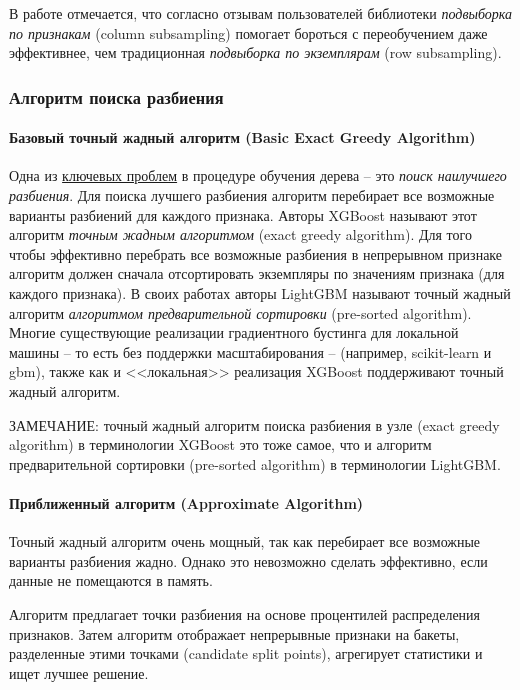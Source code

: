 \documentclass[%
	11pt,
	a4paper,
	utf8,
		]{article}
\begin{document}
В работе отмечается, что согласно отзывам пользователей библиотеки \emph{подвыборка по признакам} (column subsampling) помогает бороться с переобучением даже эффективнее, чем традиционная \emph{подвыборка по экземплярам} (row subsampling).

\subsubsection{Алгоритм поиска разбиения}

\paragraph{Базовый точный жадный алгоритм (Basic Exact Greedy Algorithm)} 

Одна из \underline{ключевых проблем} в процедуре обучения дерева -- это \emph{поиск наилучшего разбиения}. Для поиска лучшего разбиения алгоритм перебирает все возможные варианты разбиений для каждого признака. Авторы XGBoost называют этот алгоритм \emph{точным жадным алгоритмом} (exact greedy algorithm). Для того чтобы эффективно перебрать все возможные разбиения в непрерывном признаке алгоритм должен сначала отсортировать экземпляры по значениям признака (для каждого признака). В своих работах авторы LightGBM называют точный жадный алгоритм \emph{алгоритмом предварительной сортировки} (pre-sorted algorithm). Многие существующие реализации градиентного бустинга для локальной машины -- то есть без поддержки масштабирования -- (например, scikit-learn и gbm), также как и <<локальная>> реализация XGBoost поддерживают точный жадный алгоритм.

ЗАМЕЧАНИЕ: точный жадный алгоритм поиска разбиения в узле (exact greedy algorithm) в терминологии XGBoost это тоже самое, что и алгоритм предварительной сортировки (pre-sorted algorithm) в терминологии LightGBM.

\paragraph{Приближенный алгоритм (Approximate Algorithm)} Точный жадный алгоритм очень мощный, так как перебирает все возможные варианты разбиения жадно. Однако это невозможно сделать эффективно, если данные не помещаются в память.

Алгоритм предлагает точки разбиения на основе процентилей распределения признаков. Затем алгоритм отображает непрерывные признаки на бакеты, разделенные этими точками (candidate split points), агрегирует статистики и ищет лучшее решение.
\end{document}
